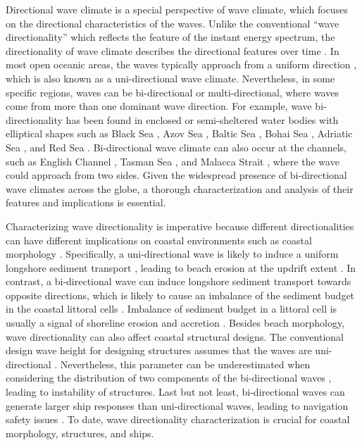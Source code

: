Directional wave climate is a special perspective of wave climate, which focuses on the directional characteristics of the waves. Unlike the conventional “wave directionality” which reflects the feature of the instant energy spectrum, the directionality of wave climate describes the directional features over time \citep{wiggins_coastal_2019,wiggins_regionally-coherent_2019}. In most open oceanic areas, the waves typically approach from a uniform direction \citep{echevarria_seasonal_2019, echevarria_influence_2020}, which is also known as a uni-directional wave climate. Nevertheless, in some specific regions, waves can be bi-directional or multi-directional, where waves come from more than one dominant wave direction. For example, wave bi-directionality has been found in enclosed or semi-sheltered water bodies with elliptical shapes such as Black Sea \citep{gippius_black_2020}, Azov Sea \citep{amarouche_wind-sea_2024}, Baltic Sea \citep{mannikus_directional_2023}, Bohai Sea \citep{miao_study_2024}, Adriatic Sea \citep{mannikus_directional_2023}, and Red Sea \citep{shamji_extreme_2020}. Bi-directional wave climate can also occur at the channels, such as English Channel \citep{wiggins_regionally-coherent_2019}, Tasman Sea \citep{mortlock_directional_2015}, and Malacca Strait \citep{aboobacker_wave_2017}, where the wave could approach from two sides. Given the widespread presence of bi-directional wave climates across the globe, a thorough characterization and analysis of their features and implications is essential.

Characterizing wave directionality is imperative because different directionalities can have different implications on coastal environments such as coastal morphology \citep{ranasinghe_southern_2004}. Specifically, a uni-directional wave is likely to induce a uniform longshore sediment transport \citep{scott_role_2021}, leading to beach erosion at the updrift extent \citep{klein_short-term_2002}. In contrast, a bi-directional wave can induce longshore sediment transport towards opposite directions, which is likely to cause an imbalance of the sediment budget in the coastal littoral cells \citep{usace_cem_2002}. Imbalance of sediment budget in a littoral cell is usually a signal of shoreline erosion and accretion \citep{hapke_review_2010,lopez-olmedilla_effect_2022}. Besides beach morphology, wave directionality can also affect coastal structural designs. The conventional design wave height for designing structures assumes that the waves are uni-directional \citep{sanil_kumar_design_2004}. Nevertheless, this parameter can be underestimated when considering the distribution of two components of the bi-directional waves \citep{sanil_kumar_design_2004}, leading to instability of structures. Last but not least, bi-directional waves can generate larger ship responses than uni-directional waves, leading to navigation safety issues \citep{huang_cfd_2021}. To date, wave directionality characterization is crucial for coastal morphology, structures, and ships.


